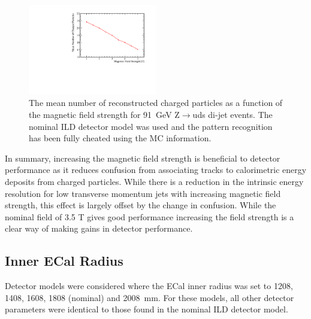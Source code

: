 \begin{figure}[h!]
\includegraphics[width=0.5\textwidth]{OptimisationStudies/Plots/Description/BField/BFieldNumbers_91GeV_Z_uds.pdf}
\caption[The mean number of reconstructed charged particles as a function of the magnetic field strength for 91~GeV Z$\rightarrow$uds di-jet events.  The nominal ILD detector model was used and the pattern recognition has been fully cheated using the MC information.]{The mean number of reconstructed charged particles as a function of the magnetic field strength for 91~GeV Z$\rightarrow$uds di-jet events.  The nominal ILD detector model was used and the pattern recognition has been fully cheated using the MC information.}
\label{fig:bfieldchargedparticles}
\end{figure}

In summary, increasing the magnetic field strength is beneficial to detector performance as it reduces confusion from associating tracks to calorimetric energy deposits from charged particles.  While there is a reduction in the intrinsic energy resolution for low transverse momentum jets with increasing magnetic field strength, this effect is largely offset by the change in confusion.  While the nominal field of 3.5 T gives good performance increasing the field strength is a clear way of making gains in detector performance.


\subsection{Inner ECal Radius}
Detector models were considered where the ECal inner radius was set to 1208, 1408, 1608, 1808 (nominal) and 2008~mm.  For these models, all other detector parameters were identical to those found in the nominal ILD detector model.

